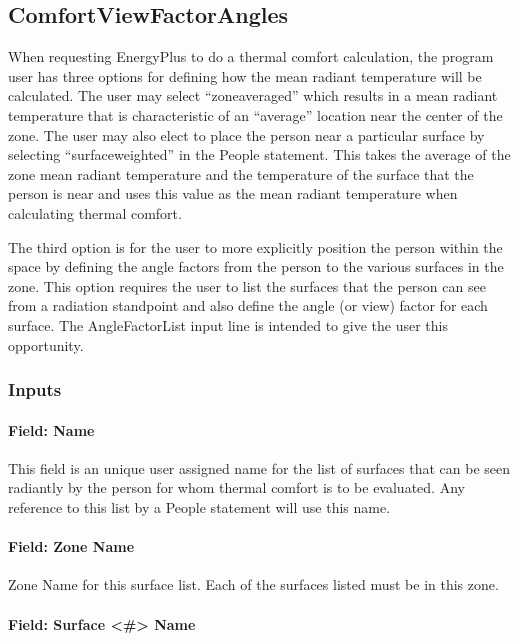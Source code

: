 \subsection{ComfortViewFactorAngles}\label{comfortviewfactorangles}

When requesting EnergyPlus to do a thermal comfort calculation, the program user has three options for defining how the mean radiant temperature will be calculated. The user may select ``zoneaveraged'' which results in a mean radiant temperature that is characteristic of an ``average'' location near the center of the zone. The user may also elect to place the person near a particular surface by selecting ``surfaceweighted'' in the People statement. This takes the average of the zone mean radiant temperature and the temperature of the surface that the person is near and uses this value as the mean radiant temperature when calculating thermal comfort.

The third option is for the user to more explicitly position the person within the space by defining the angle factors from the person to the various surfaces in the zone. This option requires the user to list the surfaces that the person can see from a radiation standpoint and also define the angle (or view) factor for each surface. The AngleFactorList input line is intended to give the user this opportunity.

\subsubsection{Inputs}\label{inputs-1-023}

\paragraph{Field: Name}\label{field-name-1-022}

This field is an unique user assigned name for the list of surfaces that can be seen radiantly by the person for whom thermal comfort is to be evaluated. Any reference to this list by a People statement will use this name.

\paragraph{Field: Zone Name}\label{field-zone-name-007}

Zone Name for this surface list. Each of the surfaces listed must be in this zone.

\paragraph{Field: Surface \textless{}\#\textgreater{} Name}\label{field-surface-name-002}


